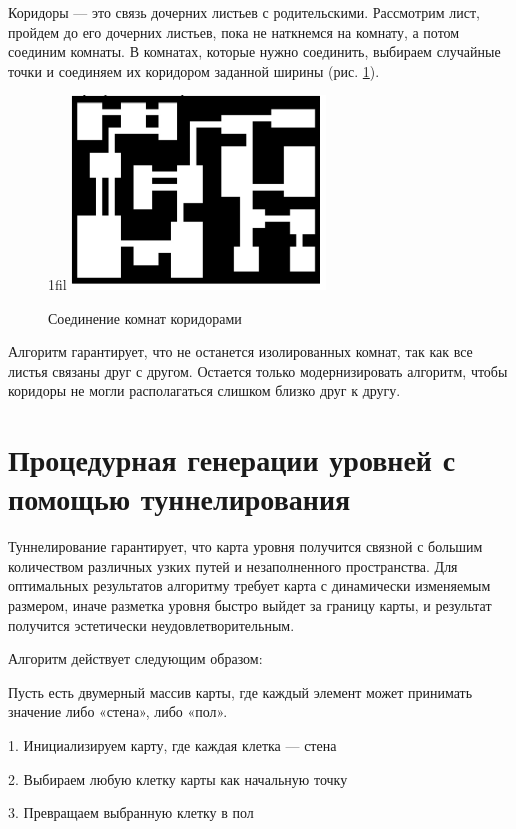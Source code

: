 \documentclass[a4paper,12pt]{report}
\makeatletter
\theoremstyle{remark}
\newcommand*{\centerfloat}{%
  \parindent \z@
  \leftskip \z@ \@plus 1fil \@minus \textwidth
  \rightskip\leftskip
  \parfillskip \z@skip}
\makeatother
\begin{document}
Коридоры — это связь дочерних листьев с родительскими. Рассмотрим лист, пройдем до его дочерних листьев, пока не наткнемся на комнату, а потом соединим комнаты. В комнатах, которые нужно соединить, выбираем случайные точки и соединяем их коридором заданной ширины (рис. \ref{fig:bsp3}).

\begin{figure}
    \centerfloat
    \includegraphics[width=0.6\textwidth]{levels/4.png}
    \caption{Соединение комнат коридорами}
    \label{fig:bsp3}
\end{figure}

Алгоритм гарантирует, что не останется изолированных комнат, так как все листья связаны друг с другом. Остается только модернизировать алгоритм, чтобы коридоры не могли располагаться слишком близко друг к другу.

\section{Процедурная генерации уровней с помощью туннелирования}

Туннелирование\citep{tunnel} гарантирует, что карта уровня получится связной с большим количеством различных узких путей и незаполненного пространства. Для оптимальных результатов алгоритму требует карта с динамически изменяемым размером, иначе разметка уровня быстро выйдет за границу карты, и результат получится эстетически неудовлетворительным.

Алгоритм действует следующим образом:

Пусть есть двумерный массив карты, где каждый элемент может принимать значение либо «стена», либо «пол».

1. Инициализируем карту, где каждая клетка — стена

2. Выбираем любую клетку карты как начальную точку

3. Превращаем выбранную клетку в пол
\end{document}
